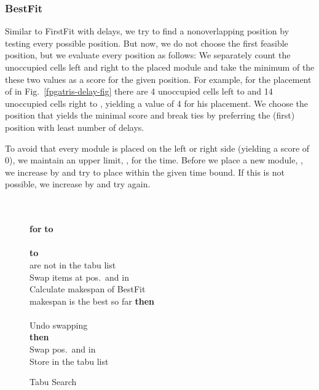 \documentclass[10pt,journal]{IEEEtran}
\begin{document}
\subsubsection{BestFit} Similar to FirstFit with delays, we try to find a 
nonoverlapping position by testing every possible position. But now,
we do not choose the first feasible position, but we evaluate every
position as follows:
We separately count the unoccupied cells left and right to the placed module
and take the minimum of the these two values as a score for the given position.
For example, for the placement of  in Fig.~\ref{fpgatris-delay-fig}
there are 4 unoccupied cells left to  and 14 unoccupied cells
right to , yielding a value of 4 for his placement.
We choose the position that yields the minimal score and break ties by
preferring the (first) position with least number of delays.

To avoid that every module is placed on the left or right side (yielding a
score of 0), we maintain an upper limit, , for the time.
Before we place a new module, , we increase  by
  and try to place  within the given time bound. 
If this is not possible, we increase  by  and
try again.

\begin{figure}[t]
\mbox{}\hrulefill\\
\\
{\bf for}  {\bf to} \\
\mbox{}\quad \\
\mbox{}  {\bf to} \\
\mbox{}  are not in the tabu list\\
\mbox{}\qquad\quad Swap items at pos.\ 
and  in \\
\mbox{}\qquad\quad Calculate makespan of BestFit\\
\mbox{}\qquad{} makespan is the best so far {\bf then}\\ 
\mbox{}\qquad\qquad \\
\mbox{}\qquad\quad Undo swapping\\
\mbox{}   {\bf then}\\
\mbox{}\qquad Swap pos.\  and 
in \\
\mbox{}\qquad Store  
in the tabu list\\
\mbox{}\hrulefill
\caption{Tabu Search\label{fpgatris:tabusearch}}
\end{figure}
\end{document}
